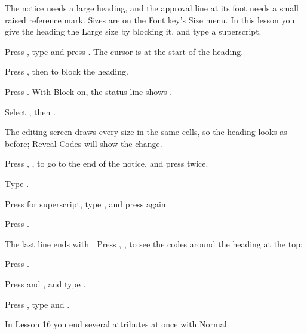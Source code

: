 The notice needs a large heading, and the approval line at its foot needs a
small raised reference mark.  Sizes are on the Font key's Size menu.  In
this lesson you give the heading the Large size by blocking it, and type a
superscript.

\begin{WPSteps}
\item Press , type  and press
.  The cursor is at the start of the heading.
\item Press , then  to block the heading.
\item Press .  With Block on, the status line shows
.
\item Select , then .
\end{WPSteps}
The editing screen draws every size in the same cells, so the heading looks
as before; Reveal Codes will show the change.

\begin{WPSteps}
\item Press , ,  to go to the end
of the notice, and press  twice.
\item Type .
\item Press  for superscript, type , and
press  again.
\item Press .
\end{WPSteps}
The last line ends with .  Press
, ,  to see the codes around the
heading at the top:

\begin{WPSteps}
\item Press .
\item Press  and , and type .
\item Press , type  and .
\end{WPSteps}
\EndReplay
In Lesson 16 you end several attributes at once with Normal.
